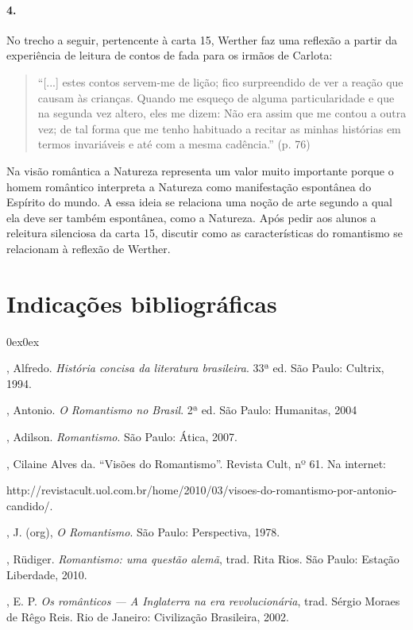 \documentclass[11pt]{hedrabook}
\begin{document}
\paragraph{4.}

No trecho a seguir, pertencente à carta 15, Werther faz uma reflexão
a partir da experiência de leitura de contos de fada para os irmãos de
Carlota:

\begin{quote}
  “[...] estes contos servem-me de lição; fico surpreendido de ver a
  reação que causam às crianças. Quando me esqueço de alguma
  particularidade e que na segunda vez altero, eles me dizem: Não era
  assim que me contou a outra vez; de tal forma que me tenho habituado a
  recitar as minhas histórias em termos invariáveis e até com a mesma
  cadência.” (p. 76)
\end{quote}

Na visão romântica a Natureza representa um valor muito importante
porque o homem romântico interpreta a Natureza como manifestação
espontânea do Espírito do mundo. A essa ideia se relaciona uma noção de
arte segundo a qual ela deve ser também espontânea, como a Natureza.
Após pedir aos alunos a releitura silenciosa da carta 15, discutir como
as características do romantismo se relacionam à reflexão de Werther.



\section{Indicações bibliográficas}

\begin{description}0ex\parsep0ex
\newcommand{\tit}[1]{\item[\textnormal{\textsc{\MakeTextLowercase{#1}}}]}
\newcommand{\titidem}{\item[\line(1,0){25}]}

\tit{Bosi}, Alfredo. \textit{História concisa da literatura brasileira}. 33ª
ed. São Paulo: Cultrix, 1994.

\tit{Candido}, Antonio. \textit{O Romantismo no Brasil}. 2ª ed. São Paulo:
Humanitas, 2004

\tit{Citelli}, Adilson. \textit{Romantismo}. São Paulo: Ática, 2007.

\tit{Cunha}, Cilaine Alves da. “Visões do Romantismo”. Revista Cult, nº 61. Na
internet:

\tit{}http://revistacult.uol.com.br/home/2010/03/visoes-do-romantismo-por-antonio-candido/.

\tit{Ginsburg}, J. (org), \textit{O Romantismo}. São Paulo: Perspectiva, 1978.

\tit{Safranski}, Rüdiger. \textit{Romantismo: uma questão alemã}, trad. Rita
Rios. São Paulo: Estação Liberdade, 2010.

\tit{Thompson}, E. P. \textit{Os românticos --- A Inglaterra na era
revolucionária}, trad. Sérgio Moraes de Rêgo Reis. Rio de Janeiro:
Civilização Brasileira, 2002.

\end{description}
\end{document}
